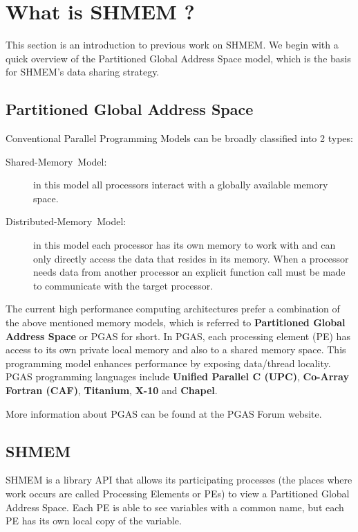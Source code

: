 
\section{What is SHMEM ?}

This section is an introduction to previous work on SHMEM. We begin
with a quick overview of the Partitioned Global Address Space model,
which is the basis for SHMEM's data sharing strategy.


\subsection{Partitioned Global Address Space}

Conventional Parallel Programming Models can be broadly classified
into 2 types: 
\begin{description}
\item [{{Shared-Memory~Model:}}] in this model all processors interact
with a globally available memory space. 
\item [{{Distributed-Memory~Model:}}] in this model each processor has
its own memory to work with and can only directly access the data
that resides in its memory. When a processor needs data from another
processor an explicit function call must be made to communicate with
the target processor. 
\end{description}
The current high performance computing architectures prefer a combination
of the above mentioned memory models, which is referred to \textbf{Partitioned
Global Address Space} or PGAS for short. In PGAS, each processing
element (PE) has access to its own private local memory and also to
a shared memory space. This programming model enhances performance
by exposing data/thread locality. PGAS programming languages include
\textbf{Unified Parallel C (UPC)}, \textbf{Co-Array Fortran (CAF)},
\textbf{Titanium}, \textbf{X-10} and \textbf{Chapel}.

More information about PGAS can be found at the PGAS Forum website.\cite{pgasfor}


\subsection{SHMEM}

%

SHMEM is a library API that allows its participating processes (the
places where work occurs are called Processing Elements or PEs) to
view a Partitioned Global Address Space. Each PE is able to see
variables with a common name, but each PE has its own local copy
of the variable.

